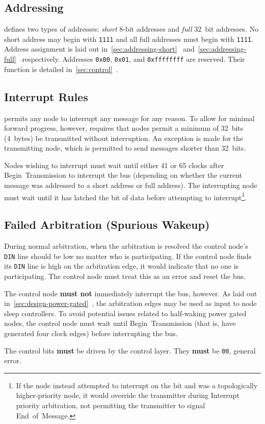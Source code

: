\subsection{Addressing}
\label{sec:spec-address}
\bus defines two types of addresses: \textit{short} 8-bit addresses and
\textit{full} 32~bit addresses. No short address may begin with {\tt 1111} and
all full addresses must begin with {\tt 1111}. Address assignment is laid out
in~\ref{sec:addressing-short}~
and~\ref{sec:addressing-full}~ respectively.
%
Addresses {\tt 0x00}, {\tt 0x01}, and {\tt 0xffffffff} are reserved. Their
function is detailed in~\ref{sec:control}~.

\subsection{Interrupt Rules}
\label{sec:spec-interrupt}
\bus permits any node to interrupt any message for any reason. To allow for
minimal forward progress, however, \bus requires that nodes permit a minimum
of 32~bits (4~bytes) be transmitted without interruption. An exception is made
for the transmitting node, which is permitted to send messages shorter than
32~bits.

Nodes wishing to interrupt must wait until either 41 or 65 clocks after
Begin~Transmission to interrupt the bus (depending on whether the current
message was addressed to a short address or full address). The interrupting
node must wait until it has latched the  bit of data before attempting
to interrupt\footnote{
  If the node instead attempted to interrupt on the  bit and was a
  topologically higher-priority node, it would override the transmitter during
  Interrupt priority arbitration, not permitting the transmitter to signal
  End~of~Message.}.

\subsection{Failed Arbitration (Spurious Wakeup)}
\label{sec:spec-spurious}
During normal arbitration, when the arbitration is resolved the control node's
{\tt DIN} line should be low no matter who is participating. If the control
node finds its {\tt DIN} line is high on the arbitration edge, it would
indicate that no one is participating. The control node must treat this as an
error and reset the bus.

The control node {\bf must not} immediately interrupt the bus, however. As
laid out in~\ref{sec:design-power-gated}~, the
arbitration edges may be used as input to node sleep controllers. To avoid
potential issues related to half-waking power gated nodes, the control node
must wait until Begin~Transmission (that is, have generated four clock edges)
before interrupting the bus.

The control bits {\bf must} be driven by the control layer. They {\bf must} be
{\tt 00}, general error.
